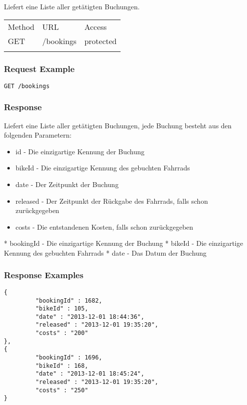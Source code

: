 Liefert eine Liste aller getätigten Buchungen.

\begin{longtable}[c]{@{}lll@{}}
\toprule\addlinespace
Method & URL & Access
\\\addlinespace
\midrule\endhead
GET & /bookings & protected
\\\addlinespace
\bottomrule
\end{longtable}

\subsubsection{Request Example}\label{request-example}

\begin{verbatim}
GET /bookings
\end{verbatim}

\subsubsection{Response}\label{response}

Liefert eine Liste aller getätigten Buchungen, jede Buchung besteht aus
den folgenden Parametern: 
\begin{itemize}
\item id - Die einzigartige Kennung der Buchung
\item bikeId - Die einzigartige Kennung des gebuchten Fahrrads
\item date - Der Zeitpunkt der Buchung
\item released - Der Zeitpunkt der Rückgabe des Fahrrads, falls schon zurückgegeben
\item costs - Die entstandenen Kosten, falls schon zurückgegeben
\end{itemize}

* bookingId - Die einzigartige Kennung der
Buchung * bikeId - Die einzigartige Kennung des gebuchten Fahrrads *
date - Das Datum der Buchung

\subsubsection{Response Examples}\label{response-examples}

\begin{verbatim}
{
         "bookingId" : 1682,
         "bikeId" : 105,
         "date" : "2013-12-01 18:44:36",
         "released" : "2013-12-01 19:35:20",
         "costs" : "200"
},
{
         "bookingId" : 1696,
         "bikeId" : 168,
         "date" : "2013-12-01 18:45:24",
         "released" : "2013-12-01 19:35:20",
         "costs" : "250"
}
\end{verbatim}
